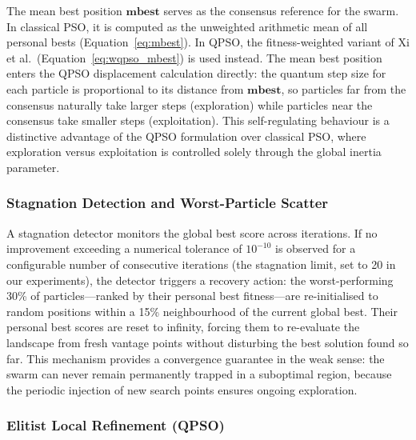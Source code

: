 The mean best position $\mathbf{mbest}$ serves as the consensus reference for
the swarm.  In classical PSO, it is computed as the unweighted arithmetic mean
of all personal bests (Equation~\ref{eq:mbest}).  In QPSO, the
fitness-weighted variant of Xi et al.\ (Equation~\ref{eq:wqpso_mbest}) is used
instead.  The mean best position enters the QPSO displacement calculation
directly: the quantum step size for each particle is proportional to its
distance from $\mathbf{mbest}$, so particles far from the consensus naturally
take larger steps (exploration) while particles near the consensus take smaller
steps (exploitation).  This self-regulating behaviour is a distinctive
advantage of the QPSO formulation over classical PSO, where exploration versus
exploitation is controlled solely through the global inertia parameter.

\subsubsection{Stagnation Detection and Worst-Particle Scatter}

A stagnation detector monitors the global best score across iterations.  If no
improvement exceeding a numerical tolerance of $10^{-10}$ is observed for a
configurable number of consecutive iterations (the stagnation limit, set to 20
in our experiments), the detector triggers a recovery action: the worst-performing 30\%
of particles---ranked by their personal best fitness---are re-initialised to
random positions within a 15\% neighbourhood of the current global best.
Their personal best scores are reset to infinity, forcing them to re-evaluate
the landscape from fresh vantage points without disturbing the best solution
found so far.  This mechanism provides a convergence guarantee in the weak
sense: the swarm can never remain permanently trapped in a suboptimal region,
because the periodic injection of new search points ensures ongoing
exploration.

\subsubsection{Elitist Local Refinement (QPSO)}


